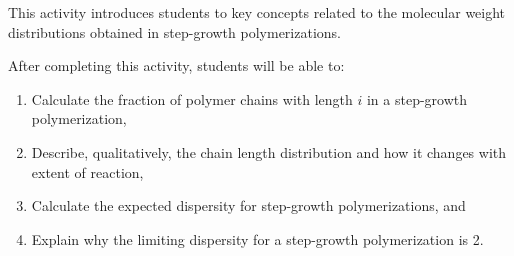 %
%
%
%

\renewcommand{\figpath}{content/polymchem/stepgrowth/dispersity/figs}

\begin{activity}

\begin{instructornotes}

	This activity introduces students to key concepts related to the molecular weight distributions obtained in step-growth polymerizations.
	
	After completing this activity, students will be able to:
			\begin{enumerate}
				\item Calculate the fraction of polymer chains with length $i$ in a step-growth polymerization,
				\item Describe, qualitatively, the chain length distribution and how it changes with extent of reaction,
				\item Calculate the expected dispersity for step-growth polymerizations, and
				\item Explain why the limiting dispersity for a step-growth polymerization is 2.
			\end{enumerate}
			

\end{instructornotes}
\end{activity}
